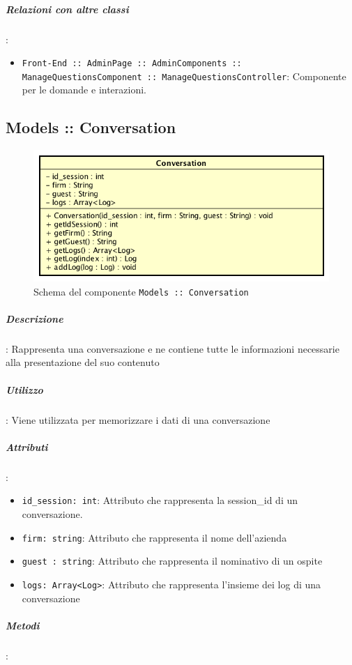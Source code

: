 \documentclass[../ManualeSviluppatore_v2.0.0.tex]{subfiles}
\begin{document}
		\subparagraph{Relazioni con altre classi}:
		      \begin{itemize}
		      	\item \texttt{Front-End :: AdminPage :: AdminComponents :: ManageQuestionsComponent :: ManageQuestionsController}: Componente per le domande e interazioni.
		      \end{itemize}


\newpage
	\subsection{Models :: Conversation}
	\begin{figure}[!h]
		\centering
		\includegraphics[scale=0.6]{Architettura/Front-End/Models/Conversation.png}
		\caption{Schema del componente \texttt{Models :: Conversation}}
	\end{figure}
		\subparagraph{Descrizione}: Rappresenta una conversazione e ne contiene tutte le informazioni necessarie alla presentazione del suo contenuto
		\subparagraph{Utilizzo}: Viene utilizzata per memorizzare i dati di una conversazione
		\subparagraph{Attributi}:
				\begin{itemize}
					\item \texttt{id\_session: int}: Attributo che rappresenta la session\_id di un conversazione.

					\item \texttt{firm: string}: Attributo che rappresenta il nome dell'azienda

					\item \texttt{guest : string}: Attributo che rappresenta il nominativo di un ospite

					\item \texttt{logs: Array<Log>}: Attributo che rappresenta l'insieme dei log di una conversazione
				\end{itemize}
			\subparagraph{Metodi}:
\end{document}
